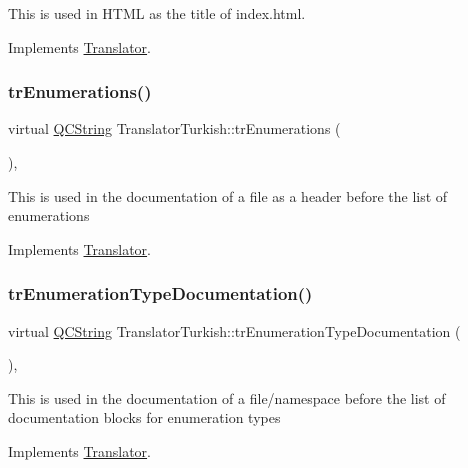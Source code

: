 This is used in H\+T\+ML as the title of index.\+html. 

Implements \mbox{\hyperlink{class_translator}{Translator}}.

\mbox{\label{class_translator_turkish_af79f278edd85481075f1532bac6cafd9}} 
\subsubsection{\texorpdfstring{trEnumerations()}{trEnumerations()}}
{\footnotesize\ttfamily virtual \mbox{\hyperlink{class_q_c_string}{Q\+C\+String}} Translator\+Turkish\+::tr\+Enumerations (\begin{DoxyParamCaption}{ }\end{DoxyParamCaption})\hspace{0.3cm}{\ttfamily [inline]}, {\ttfamily [virtual]}}

This is used in the documentation of a file as a header before the list of enumerations 

Implements \mbox{\hyperlink{class_translator}{Translator}}.

\mbox{\label{class_translator_turkish_a2c460b9a13def472bc4211f3ed750556}} 
\subsubsection{\texorpdfstring{trEnumerationTypeDocumentation()}{trEnumerationTypeDocumentation()}}
{\footnotesize\ttfamily virtual \mbox{\hyperlink{class_q_c_string}{Q\+C\+String}} Translator\+Turkish\+::tr\+Enumeration\+Type\+Documentation (\begin{DoxyParamCaption}{ }\end{DoxyParamCaption})\hspace{0.3cm}{\ttfamily [inline]}, {\ttfamily [virtual]}}

This is used in the documentation of a file/namespace before the list of documentation blocks for enumeration types 

Implements \mbox{\hyperlink{class_translator}{Translator}}.

